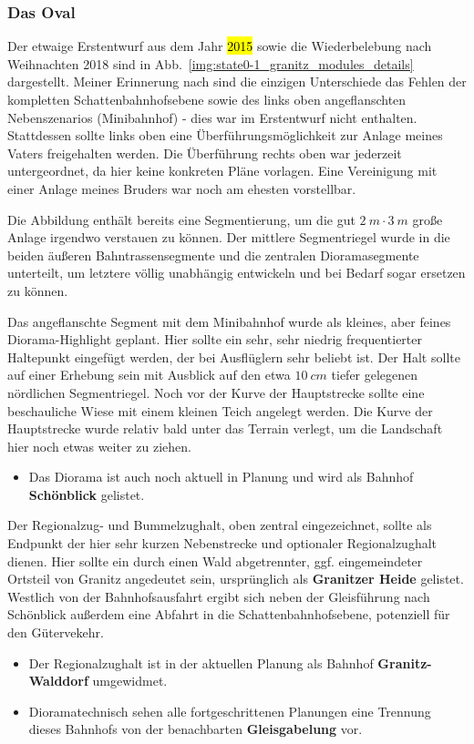 \subsubsection{Das Oval}
\label{sec:map_development_state1}

Der etwaige Erstentwurf aus dem Jahr \hl{2015} sowie die Wiederbelebung nach Weihnachten 2018 sind in Abb.~\ref{img:state0-1_granitz_modules_details} dargestellt.
Meiner Erinnerung nach sind die einzigen Unterschiede das Fehlen der kompletten Schattenbahnhofsebene sowie des links oben angeflanschten Nebenszenarios (Minibahnhof) - dies war im Erstentwurf nicht enthalten.
Stattdessen sollte links oben eine \"Uberf\"uhrungsm\"oglichkeit zur Anlage meines Vaters freigehalten werden.
Die \"Uberf\"uhrung rechts oben war jederzeit untergeordnet, da hier keine konkreten Pl\"ane vorlagen.
Eine Vereinigung mit einer Anlage meines Bruders war noch am ehesten vorstellbar.

Die Abbildung enth\"alt bereits eine Segmentierung, um die gut $2~m \cdot 3~m$ gro{\ss}e Anlage irgendwo verstauen zu k\"onnen.
Der mittlere Segmentriegel wurde in die beiden \"au{\ss}eren Bahntrassensegmente und die zentralen Dioramasegmente unterteilt, um letztere v\"ollig unabh\"angig entwickeln und bei Bedarf sogar ersetzen zu k\"onnen.

Das angeflanschte Segment mit dem Minibahnhof wurde als kleines, aber feines Diorama-Highlight geplant.
Hier sollte ein sehr, sehr niedrig frequentierter Haltepunkt eingef\"ugt werden, der bei Ausfl\"uglern sehr beliebt ist.
Der Halt sollte auf einer Erhebung sein mit Ausblick auf den etwa $10~cm$ tiefer gelegenen n\"ordlichen Segmentriegel.
Noch vor der Kurve der Hauptstrecke sollte eine beschauliche Wiese mit einem kleinen Teich angelegt werden.
Die Kurve der Hauptstrecke wurde relativ bald unter das Terrain verlegt, um die Landschaft hier noch etwas weiter zu ziehen.
\begin{itemize}
	\item Das Diorama ist auch noch aktuell in Planung und wird als Bahnhof \textbf{Sch\"onblick} gelistet.
\end{itemize}

Der Regionalzug- und Bummelzughalt, oben zentral eingezeichnet, sollte als Endpunkt der hier sehr kurzen Nebenstrecke und optionaler Regionalzughalt dienen.
Hier sollte ein durch einen Wald abgetrennter, ggf. eingemeindeter Ortsteil von Granitz angedeutet sein, urspr\"unglich als \textbf{Granitzer Heide} gelistet.
Westlich von der Bahnhofsausfahrt ergibt sich neben der Gleisf\"uhrung nach Sch\"onblick au{\ss}erdem eine Abfahrt in die Schattenbahnhofsebene, potenziell f\"ur den G\"utervekehr.
\begin{itemize}
	\item Der Regionalzughalt ist in der aktuellen Planung als Bahnhof \textbf{Granitz-Walddorf} umgewidmet.
	\item Dioramatechnisch sehen alle fortgeschrittenen Planungen eine Trennung dieses Bahnhofs von der benachbarten \textbf{Gleisgabelung} vor.
\end{itemize}


